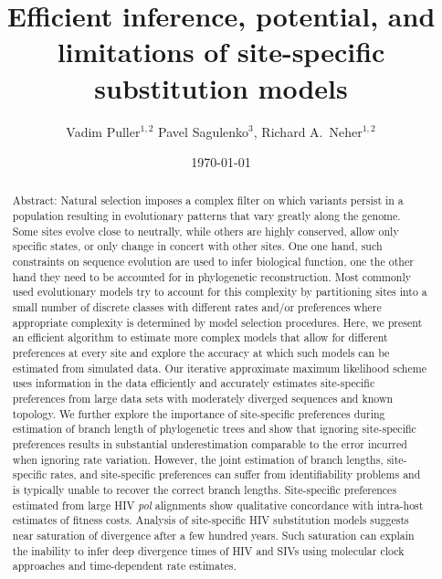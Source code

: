 \documentclass[aps,rmp,twocolumn,linenumbers]{revtex4-1}
\begin{document}
\title{Efficient inference, potential, and limitations of site-specific substitution models}
\author{Vadim Puller$^{1,2}$ Pavel Sagulenko$^{3}$, Richard A.~Neher$^{1,2}$}

\date{\today}

\begin{abstract}
Abstract: Natural selection imposes a complex filter on which variants persist in a population resulting in evolutionary patterns that vary greatly along the genome.
Some sites evolve close to neutrally, while others are highly conserved, allow only specific states, or only change in concert with other sites.
One one hand, such constraints on sequence evolution are used to infer biological function, one the other hand they need to be accounted for in phylogenetic reconstruction.
Most commonly used evolutionary models try to account for this complexity by partitioning sites into a small number of discrete classes with different rates and/or preferences where appropriate complexity is determined by model selection procedures.
Here, we present an efficient algorithm to estimate more complex models that allow for different preferences at every site and explore the accuracy at which such models can be estimated from simulated data.
Our iterative approximate maximum likelihood scheme uses information in the data efficiently and accurately estimates site-specific preferences from large data sets with moderately diverged sequences and known topology.
We further explore the importance of site-specific preferences during estimation of branch length of phylogenetic trees and show that ignoring site-specific preferences results in substantial underestimation comparable to the error incurred when ignoring rate variation.
However, the joint estimation of branch lengths, site-specific rates, and site-specific preferences can suffer from identifiability problems and is typically unable to recover the correct branch lengths.
Site-specific preferences estimated from large HIV \emph{pol} alignments show qualitative concordance with intra-host estimates of fitness costs.
Analysis of site-specific HIV substitution models suggests near saturation of divergence after a few hundred years.
Such saturation can explain the inability to infer deep divergence times of HIV and SIVs using molecular clock approaches and time-dependent rate estimates.
\end{abstract}
\end{document}
